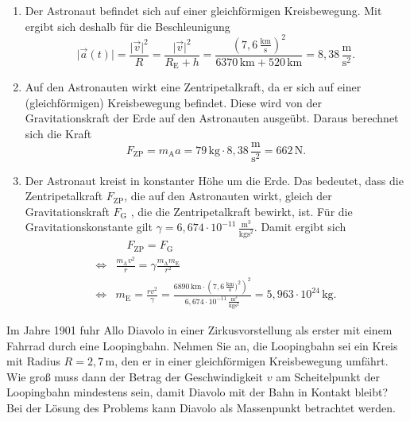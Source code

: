 \begin{MExercises}
\begin{MExercise}
  \begin{MSolution}
  \begin{enumerate}
  \item Der Astronaut befindet sich auf einer gleichf\"ormigen Kreisbewegung. Mit  ergibt sich deshalb f\"ur die Beschleunigung
  \begin{equation}
  \vert\vec{a}(t)\vert=\frac{\vert \vec{v}\vert^2}{R}=\frac{\vert \vec{v}\vert^2}{R_{\textrm{E}}+h}=\frac{(7{,}6\,\frac{\text{km}}{\text{s}})^2}{6370\,\text{km}+520\,\text{km}}=8,38\,\frac{\text{m}}{\text{s}^2}.
  \end{equation}  
  \item Auf den Astronauten wirkt eine Zentripetalkraft, da er sich auf einer (gleichf\"ormigen) Kreisbewegung befindet. Diese wird von der Gravitationskraft der Erde auf den Astronauten ausge\"ubt. Daraus berechnet sich die Kraft
  \begin{equation*}
  F_{{\textrm{ZP}}}=m_{\textrm{A}}a=79\,\text{kg}\cdot 8{,}38\,\frac{\text{m}}{\text{s}^2}=662\,\text{N.}
  \end{equation*}
  \item Der Astronaut kreist in konstanter H\"ohe um die Erde. Das bedeutet, dass die Zentripetalkraft $F_{{\textrm{ZP}}}$, die auf den Astronauten wirkt, gleich der Gravitationskraft $F_{\textrm{G}}$ , die die Zentripetalkraft bewirkt, ist. F\"ur die Gravitationskonstante gilt $\gamma=6{,}674\cdot 10^{-11}\,\frac{\text{m}^3}{\text{kgs}^2}$. Damit ergibt sich
  \begin{eqnarray*}
  &\quad F_{\textrm{ZP}}=F_{\textrm{G}}\\\Leftrightarrow &\frac{m_{\textrm{A}}v^2}{r}=\gamma\frac{m_{\textrm{A}}m_{\textrm{E}}}{r^2}\\\Leftrightarrow
  &m_{\textrm{E}}=\frac{rv^2}{\gamma}=\frac{6890\,\text{km}\cdot\left(7{,}6\,\frac{\text{km}}{\text{s}})^2\right)^2 }{6{,}674\cdot 10^{-11}\,\frac{\text{m}^3}{\text{kg}\text{s}^2}}=5{,}963\cdot 10^{24}\,\text{kg}.
  \end{eqnarray*}
  \end{enumerate}
  \end{MSolution}
  \end{MExercise}
  \begin{MExercise}
  Im Jahre 1901 fuhr Allo Diavolo in einer Zirkusvorstellung als erster mit einem Fahrrad durch eine Loopingbahn. Nehmen Sie an, die Loopingbahn sei ein Kreis mit Radius $R=2{,}7\,\text{m}$, den er in einer gleichf\"ormigen Kreisbewegung umf\"ahrt. Wie gro{\ss} muss dann der Betrag der Geschwindigkeit $v$ am Scheitelpunkt der Loopingbahn mindestens sein, damit Diavolo mit der Bahn in Kontakt bleibt? Bei der L\"osung des Problems kann Diavolo als Massenpunkt betrachtet werden.
  

\end{MExercise}
\end{MExercises}
